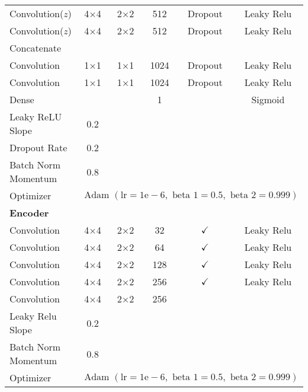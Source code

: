 \begin{longtable}[c]{@{}lccccc@{}}
	Convolution($z$) & \multicolumn{1}{c}{4$\times$4} & 2$\times$2 & 512 & Dropout & Leaky Relu \\
	Convolution($z$) & \multicolumn{1}{c}{4$\times$4} & 2$\times$2 & 512 & Dropout & Leaky Relu \\
	Concatenate &\multicolumn{5}{l}{} \\
	Convolution & \multicolumn{1}{c}{1$\times$1} & 1$\times$1 & 1024 & Dropout & Leaky Relu \\
	Convolution & \multicolumn{1}{c}{1$\times$1} & 1$\times$1 & 1024 & Dropout & Leaky Relu \\
	Dense & \multicolumn{1}{c}{} &  & 1 &  & Sigmoid \\ \hline
	Leaky ReLU Slope & 0.2 & \multicolumn{1}{l}{} & \multicolumn{1}{l}{} & \multicolumn{1}{l}{} & \multicolumn{1}{l}{} \\
	Dropout Rate & 0.2 & \multicolumn{1}{l}{} & \multicolumn{1}{l}{} & \multicolumn{1}{l}{} & \multicolumn{1}{l}{} \\
	Batch Norm Momentum & 0.8 & \multicolumn{1}{l}{} & \multicolumn{1}{l}{} & \multicolumn{1}{l}{} & \multicolumn{1}{l}{} \\
	Optimizer & \multicolumn{5}{l}{$\text { Adam }(\mathrm{lr}=1 \mathrm{e}-6, \text { beta } 1=0.5, \text { beta } 2=0.999)$} \\ \hline
	\multicolumn{6}{l}{\textbf{Encoder}} \\
	Convolution & \multicolumn{1}{c}{4$\times$4} & 2$\times$2 & 32 & $\checkmark$ & Leaky Relu \\
	Convolution & \multicolumn{1}{c}{4$\times$4} & 2$\times$2 & 64 & $\checkmark$ & Leaky Relu \\
	Convolution & \multicolumn{1}{c}{4$\times$4} & 2$\times$2 & 128 & $\checkmark$ & Leaky Relu \\
	Convolution & \multicolumn{1}{c}{4$\times$4} & 2$\times$2 & 256 & $\checkmark$ & Leaky Relu \\
	Convolution & \multicolumn{1}{c}{4$\times$4} & 2$\times$2 & 256 &  &  \\ \hline
	Leaky Relu Slope & 0.2 & \multicolumn{1}{l}{} & \multicolumn{1}{l}{} & \multicolumn{1}{l}{} & \multicolumn{1}{l}{} \\
	Batch Norm Momentum & 0.8 & \multicolumn{1}{l}{} & \multicolumn{1}{l}{} & \multicolumn{1}{l}{} & \multicolumn{1}{l}{} \\
	Optimizer & \multicolumn{5}{l}{$\text { Adam }(\mathrm{lr}=1 \mathrm{e}-6, \text { beta } 1=0.5, \text { beta } 2=0.999)$} \\ \hline

\end{longtable}
